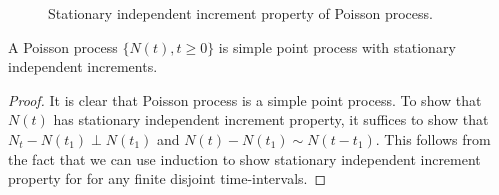 \documentclass[a4paper,10pt,english]{article}
\begin{document}
\begin{figure}[hhhh]
\center
	
  	\caption{Stationary independent increment property of Poisson process.}
	\label{Fig:IndependentIncrements}
\end{figure}
\begin{prop} A Poisson process $\{N(t), t\geqslant 0\}$ is simple point process with stationary independent increments.
\end{prop}
\begin{proof}
It is clear that Poisson process is a simple point process. 
To show that $N(t)$ has stationary independent increment property, it suffices to show that $N_t-N(t_{1}) \perp N(t_1)$ and $N(t) - N(t_1) \sim N(t-t_1)$. 
This follows from the fact that we can use induction to show stationary independent increment property for for any finite disjoint time-intervals.


\end{proof}
\end{document}
